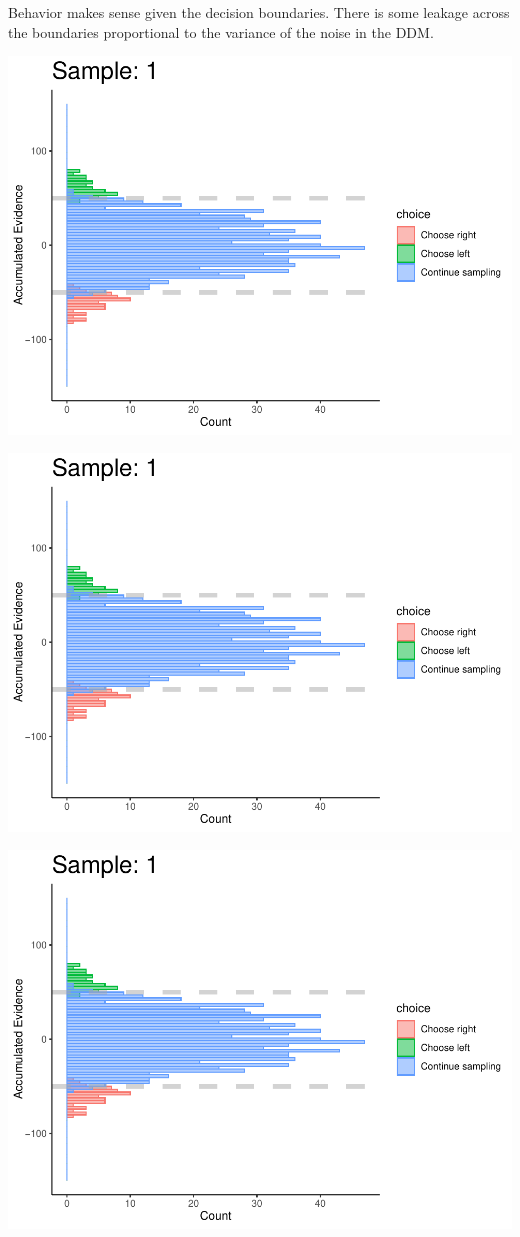 \documentclass[
]{book}
\begin{document}
Behavior makes sense given the decision boundaries. There is some leakage across the boundaries proportional to the variance of the noise in the DDM.

\begin{center}\includegraphics[width=0.8\linewidth]{LateNightBayes_files/figure-latex/fixed_check-1} \end{center}

\begin{center}\includegraphics[width=0.8\linewidth]{LateNightBayes_files/figure-latex/fixed_check-2} \end{center}

\begin{center}\includegraphics[width=0.8\linewidth]{LateNightBayes_files/figure-latex/fixed_check-3} \end{center}
\end{document}
